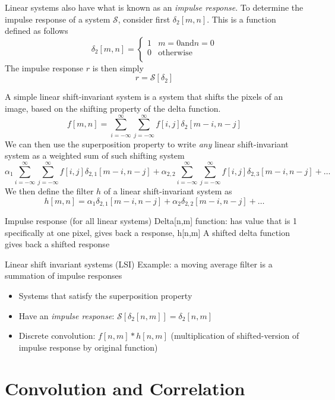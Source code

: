 \documentclass{article}
\begin{document}
Linear systems also have what is known as an \emph{impulse response}. To determine the impulse response of a system $\mathcal{S}$, consider first $\delta_2[m, n]$. This is a function defined as follows
\[
	\delta_2[m, n] = \begin{cases} 1 & m = 0 \text{and} n = 0 \\
    0 & \text{otherwise} \\
    \end{cases}
\]
The impulse response $r$ is then simply
\[
	r = \mathcal{S}[\delta_2]
\]

A simple linear shift-invariant system is a system that shifts the pixels of an image, based on the shifting property of the delta function.
\[
	f[m, n] = \sum\limits_{i = -\infty}^{\infty}\sum\limits_{j = -\infty}^{\infty} f[i, j] \delta_2[m - i, n - j]
\]
We can then use the superposition property to write \emph{any} linear shift-invariant system as a weighted sum of such shifting system
\[
	\alpha_1\sum\limits_{i = -\infty}^{\infty}\sum\limits_{j = -\infty}^{\infty} f[i, j] \delta_{2,1}[m - i, n - j] + \alpha_{2,2}\sum\limits_{i = -\infty}^{\infty}\sum\limits_{j = -\infty}^{\infty} f[i, j] \delta_{2,3}[m - i, n - j] + \dots
\]
We then define the filter $h$ of a linear shift-invariant system as 
\[
	h[m, n] = \alpha_1\delta_{2,1}[m - i, n - j] + \alpha_2\delta_{2,2}[m - i, n - j] + \dots
\]


Impulse response (for all linear systems)
Delta[n,m] function: has value that is 1 specifically at one pixel, gives back a response, h[n,m]
A shifted delta function gives back a shifted response

Linear shift invariant systems (LSI)
Example: a moving average filter is a summation of impulse responses


\begin{itemize}
		\item Systems that satisfy the superposition property
		\item Have an \emph{impulse response}: $\mathcal{S}[\delta_2[n, m]] = \delta_2[{n, m}]$
		
		\item Discrete convolution: $f[n, m] * h[n, m]$ (multiplication of shifted-version of impulse response by original function)
	\end{itemize}
    
\section{Convolution and Correlation}
\end{document}
